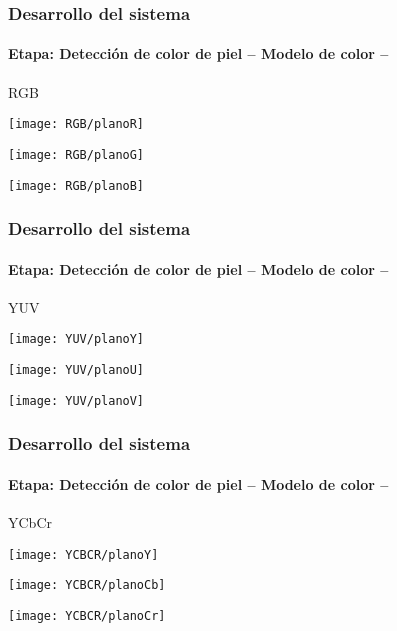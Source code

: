 \documentclass[xcolor=dvipsnames]{beamer}
\begin{document}
	\begin{frame}
		\transdissolve
		\frametitle{Desarrollo del sistema}
		\framesubtitle{Etapa: Detección de color de piel -- Modelo de color --}
		RGB
		
		\begin{center}
			\begin{minipage}[c]{.3\textwidth}
				\texttt{[image: RGB/planoR]}
			\end{minipage}
			\begin{minipage}[c]{.3\textwidth}
				\texttt{[image: RGB/planoG]}
			\end{minipage}
			\begin{minipage}[c]{.3\textwidth}
				\texttt{[image: RGB/planoB]}
			\end{minipage}
		\end{center}
	\end{frame}

	\begin{frame}
		\transdissolve
		\frametitle{Desarrollo del sistema}
		\framesubtitle{Etapa: Detección de color de piel -- Modelo de color --}
		YUV
		
		\begin{center}
			\begin{minipage}[c]{.3\textwidth}
				\texttt{[image: YUV/planoY]}
			\end{minipage}
			\begin{minipage}[c]{.3\textwidth}
				\texttt{[image: YUV/planoU]}
			\end{minipage}
			\begin{minipage}[c]{.3\textwidth}
				\texttt{[image: YUV/planoV]}
			\end{minipage}
		\end{center}
	\end{frame}

	\begin{frame}
		\transdissolve
		\frametitle{Desarrollo del sistema}
		\framesubtitle{Etapa: Detección de color de piel -- Modelo de color --}
		YCbCr
		
		\begin{center}
			\begin{minipage}[c]{.3\textwidth}
				\texttt{[image: YCBCR/planoY]}
			\end{minipage}
			\begin{minipage}[c]{.3\textwidth}
				\texttt{[image: YCBCR/planoCb]}
			\end{minipage}
			\begin{minipage}[c]{.3\textwidth}
				\texttt{[image: YCBCR/planoCr]}
			\end{minipage}
		\end{center}
	\end{frame}
\end{document}
